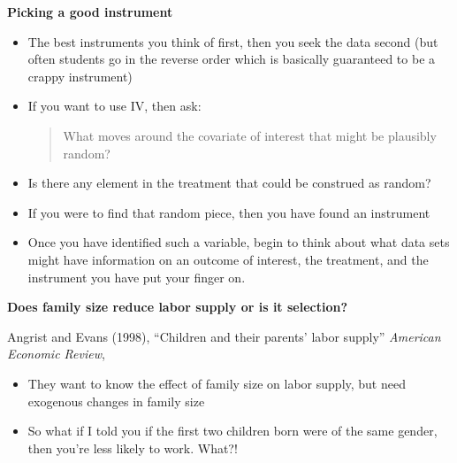 \documentclass[notes=show]{beamer}
\begin{document}
\begin{frame}[plain]
\begin{center}
\textbf{Picking a good instrument}
\end{center}

	\begin{itemize}
	\item The best instruments you think of first, then you seek the data second (but often students go in the reverse order which is basically guaranteed to be a crappy instrument)
	\item If you want to use IV, then ask: 
		\begin{quote}
		What moves around the covariate of interest that might be plausibly random?
		\end{quote}
		\item Is there any element in the treatment that could be construed as random?  
		\item If you were to find that random piece, then you have found an instrument
	\item Once you have identified such a variable, begin to think about what data sets might have information on an outcome of interest, the treatment, and the instrument you have put your finger on.
	\end{itemize}
\end{frame}



\begin{frame}[plain]
\begin{center}
\textbf{Does family size reduce labor supply or is it selection?}
\end{center}

Angrist and Evans (1998), ``Children and their parents' labor supply'' \emph{American Economic Review}, 
		\begin{itemize}
		\item They want to know the effect of family size on labor supply, but need exogenous changes in family size
		\item So what if I told you if the first two children born were of the same gender, then you're less likely to work. What?!
		\end{itemize}

\end{frame}
\end{document}
